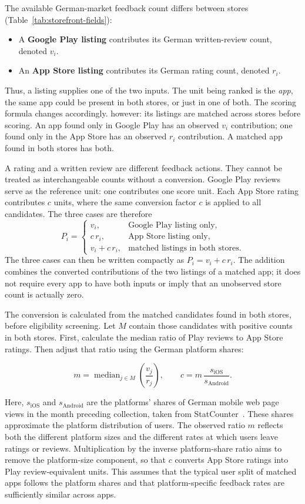 The available German-market feedback count differs between stores
(Table~\ref{tab:storefront-fields}):
\begin{itemize}
  \item A \textbf{Google Play listing} contributes its German written-review
    count, denoted $v_i$.
  \item An \textbf{App Store listing} contributes its German rating count,
    denoted $r_i$.
\end{itemize}
Thus, a listing supplies one of the two inputs. The unit being ranked is the
\emph{app}, the same app could be present in both stores, or just in one of both. The scoring formula changes accordingly.
 however: its listings are matched across stores before scoring.
An app found only in Google Play has an observed $v_i$ contribution; one found
only in the App Store has an observed $r_i$ contribution. A matched app found
in both stores has both.

A rating and a written review are different feedback actions. They cannot be
treated as interchangeable counts without a conversion. Google Play reviews
serve as the reference unit: one contributes one score unit. Each App Store
rating contributes $c$ units, where the same conversion factor $c$ is applied
to all candidates. The three cases are therefore
\[
  P_i =
  \begin{cases}
    v_i, & \text{Google Play listing only},\\
    c\,r_i, & \text{App Store listing only},\\
    v_i+c\,r_i, & \text{matched listings in both stores}.
  \end{cases}
\]
The three cases can then be written compactly as
$P_i=v_i+c\,r_i$. The addition combines the converted contributions of the two
listings of a matched app; it does not require every app to have both inputs
or imply that an unobserved store count is actually zero.

The conversion is calculated from the matched candidates found in both stores,
before eligibility screening. Let $M$ contain those candidates with positive
counts in both stores. First, calculate the median ratio of Play reviews to
App Store ratings. Then adjust that ratio using the German platform shares:

\[
  m = \operatorname{median}_{j\in M}\!\left(\frac{v_j}{r_j}\right),
  \qquad
  c = m\,\frac{s_{\mathrm{iOS}}}{s_{\mathrm{Android}}}.
\]

Here, $s_{\mathrm{iOS}}$ and $s_{\mathrm{Android}}$ are the platforms' shares of
German mobile web page views in the month preceding collection, taken from
StatCounter~\parencite{statcounter2026os}. These shares approximate the
platform distribution of users. The observed ratio $m$ reflects both the
different platform sizes and the different rates at which users leave ratings
or reviews. Multiplication by the inverse platform-share ratio aims to remove
the platform-size component, so that $c$ converts App Store ratings into Play
review-equivalent units. This assumes that the typical user split of matched
apps follows the platform shares and that platform-specific feedback rates
are sufficiently similar across apps. 

